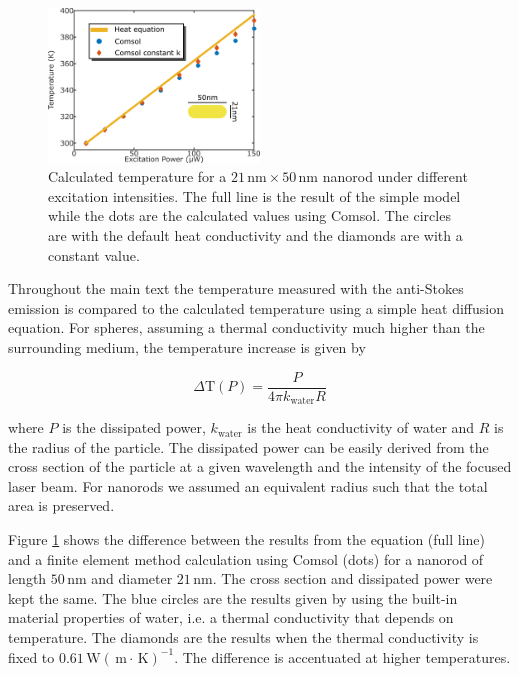 \documentclass[journal=nalefd,manuscript=letter]{achemso}
\newcommand{\K}{\ensuremath{\,\textrm{K}}}
\newcommand{\nm}{\ensuremath{\,\textrm{nm}}}
\newcommand{\m}{\ensuremath{\,\textrm{m}}}
\newcommand{\W}{\ensuremath{\,\textrm{W}}}
\begin{document}
\begin{figure}[htp] \centering
\includegraphics[width=0.5\textwidth]{Figures/Supplementary/03_Compare_Comsol/03_Compare_Comsol.png}
\caption{Calculated temperature for a $21\nm\times 50\nm$ nanorod under
different excitation intensities. The full line is the result of the simple
model while the dots are the calculated values using Comsol. The circles are
with the default heat conductivity and the diamonds are with a constant value.}
	\label{fig:Compare-Comsol}
\end{figure}

Throughout the main text the temperature measured with the anti-Stokes emission
is compared to the calculated temperature using a simple heat diffusion
equation. For spheres, assuming a thermal conductivity much higher than the
surrounding medium, the temperature increase is given by

\begin{equation}
	\Delta \textrm{T}(P) = \frac{P}{4\pi k_{\textrm{water}} R}
\end{equation}

\noindent where $P$ is the dissipated power, $k_{\textrm{water}}$ is the heat
conductivity of water and $R$ is the radius of the particle. The dissipated power can be
easily derived from the cross section of the particle at a given wavelength and
the intensity of the focused laser beam. For nanorods we assumed an
equivalent radius such that the total area is preserved.

Figure \ref{fig:Compare-Comsol} shows the difference between the results from
the equation (full line) and a finite element method calculation using Comsol
(dots) for a nanorod of length $50\nm$ and diameter $21\nm$. The cross section
and dissipated power were kept the same. The blue circles are the results given
by using the built-in material properties of water, i.e. a thermal conductivity
that depends on temperature. The diamonds are the results when the thermal
conductivity is fixed to $0.61 \W(\m\cdot\K)^{-1}$. The difference is
accentuated at higher temperatures.
\end{document}
